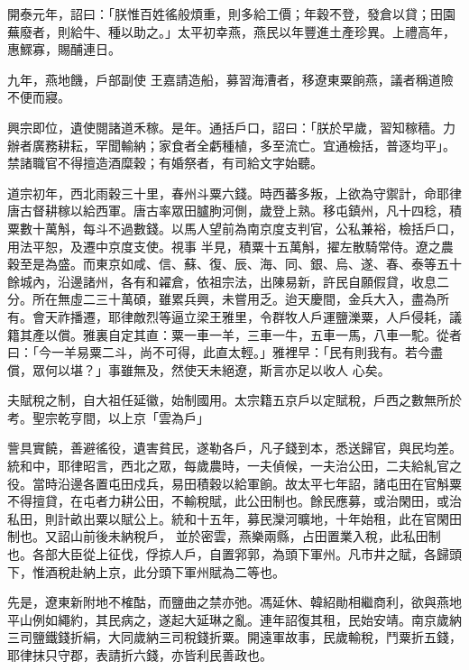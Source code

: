 \begin{pinyinscope}
 開泰元年，詔曰：「朕惟百姓徭般煩重，則多給工價；年穀不登，發倉以貸；田園蕪廢者，則給牛、種以助之。」太平初幸燕，燕民以年豐進土產珍異。上禮高年，惠鰥寡，賜酺連日。



 九年，燕地饑，戶部副使
 王嘉請造船，募習海漕者，移遼東粟餉燕，議者稱道險不便而寢。



 興宗即位，遺使閱諸道禾稼。是年。通括戶口，詔曰：「朕於早歲，習知稼穡。力辦者廣務耕耘，罕聞輸納；家食者全虧種植，多至流亡。宜通檢括，普逐均平」。禁諸職官不得擅造酒糜穀；有婚祭者，有司給文字始聽。



 道宗初年，西北雨穀三十里，春州斗粟六錢。時西蕃多叛，上欲為守禦計，命耶律唐古督耕稼以給西軍。唐古率眾田臚朐河側，歲登上熟。移屯鎮州，凡十四稔，積粟數十萬斛，每斗不過數錢。以馬人望前為南京度支判官，公私兼裕，檢括戶口，用法平恕，及遷中京度支使。視事
 半見，積粟十五萬斛，擢左散騎常侍。遼之農穀至是為盛。而東京如咸、信、蘇、復、辰、海、同、銀、烏、遂、春、泰等五十餘城內，沿邊諸州，各有和糴倉，依祖宗法，出陳易新，許民自願假貸，收息二分。所在無虛二三十萬碩，雖累兵興，未嘗用乏。迨天慶間，金兵大入，盡為所有。會天祚播遷，耶律敵烈等逼立梁王雅里，令群牧人戶運鹽濼粟，人戶侵耗，議籍其產以償。雅裏自定其直：粟一車一羊，三車一牛，五車一馬，八車一駝。從者曰：「今一羊易粟二斗，尚不可得，此直太輕。」雅裡早：「民有則我有。若今盡償，眾何以堪？」事雖無及，然使天未絕遼，斯言亦足以收人
 心矣。



 夫賦稅之制，自大祖任延徽，始制國用。太宗籍五京戶以定賦稅，戶西之數無所於考。聖宗乾亨間，以上京「雲為戶」



 訾具實饒，善避徭役，遺害貧民，遂勒各戶，凡子錢到本，悉送歸官，與民均差。統和中，耶律昭言，西北之眾，每歲農時，一夫偵候，一夫治公田，二夫給糺官之役。當時沿邊各置屯田戍兵，易田積穀以給軍餉。故太平七年詔，諸屯田在官斛粟不得擅貸，在屯者力耕公田，不輸稅賦，此公田制也。餘民應募，或治閑田，或治私田，則計畝出粟以賦公上。統和十五年，募民灤河曠地，十年始租，此在官閑田制也。又詔山前後未納稅戶，
 並於密雲，燕樂兩縣，占田置業入稅，此私田制也。各部大臣從上征伐，俘掠人戶，自置郛郭，為頭下軍州。凡市井之賦，各歸頭下，惟酒稅赴納上京，此分頭下軍州賦為二等也。



 先是，遼東新附地不榷酤，而鹽曲之禁亦弛。馮延休、韓紹勛相繼商利，欲與燕地平山例如繩約，其民病之，遂起大延琳之亂。連年詔復其租，民始安靖。南京歲納三司鹽鐵錢折絹，大同歲納三司稅錢折粟。開遠軍故事，民歲輸稅，鬥粟折五錢，耶律抹只守郡，表請折六錢，亦皆利民善政也。



\end{pinyinscope}